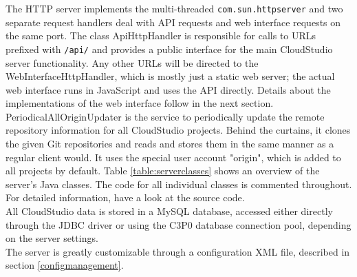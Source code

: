 The HTTP server implements the multi-threaded \texttt{com.sun.httpserver} and two separate request handlers deal with API requests and web interface requests on the same port. The class ApiHttpHandler is responsible for calls to URLs prefixed with \texttt{/api/} and provides a public interface for the main CloudStudio server functionality. Any other URLs will be directed to the Web\-Inter\-face\-Http\-Hand\-ler, which is mostly just a static web server; the actual web interface runs in JavaScript and uses the API directly. Details about the implementations of the web interface follow in the next section. \\

PeriodicalAllOriginUpdater is the service to periodically update the remote repository information for all CloudStudio projects. Behind the curtains, it clones the given Git repositories and reads and stores them in the same manner as a regular client would. It uses the special user account "origin", which is added to all projects by default. Table \ref{table:serverclasses} shows an overview of the server's Java classes. The code for all individual classes is commented throughout. For detailed information, have a look at the source code. \\

All CloudStudio data is stored in a MySQL database, accessed either directly through the JDBC driver or using the C3P0 database connection pool, depending on the server settings. \\

The server is greatly customizable through a configuration XML file, described in section \ref{configmanagement}.


